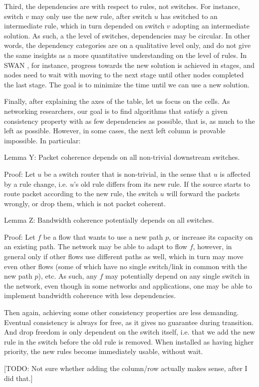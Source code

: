 Third, the dependencies are with respect to rules, not switches. For instance, switch $v$ may only use the new rule, after switch $u$ has switched to an intermediate rule, which in turn depended on switch $v$ adopting an intermediate solution. As such, a the level of switches, dependencies may be circular. In other words, the dependency categories are on a qualitative level only, and do not give the same insights as a more quantitative understanding on the level of rules. In SWAN \cite{swan}, for instance, progress towards the new solution is achieved in stages, and nodes need to wait with moving to the next stage until other nodes completed the last stage. The goal is to minimize the time until we can use a new solution.

Finally, after explaining the axes of the table, let us focus on the cells. As networking researchers, our goal is to find algorithms that satisfy a given consistency property with as few dependencies as possible, that is, as much to the left as possible. However, in some cases, the next left column is provable impossible. In particular:

Lemma Y: Packet coherence depends on all non-trivial downstream switches.

Proof: Let $u$ be a switch router that is non-trivial, in the sense that $u$ is affected by a rule change, i.e. $u$'s old rule differs from its new rule. If the source starts to route packet according to the new rule, the switch $u$ will forward the packets wrongly, or drop them, which is not packet coherent.

Lemma Z: Bandwidth coherence potentially depends on all switches.

Proof: Let $f$ be a flow that wants to use a new path $p$, or increase its capacity on an existing path. The network may be able to adapt to flow $f$, however, in general only if other flows use different paths as well, which in turn may move even other flows (some of which have no single switch/link in common with the new path $p$), etc. As such, any $f$ may potentially depend on any single switch in the network, even though in some networks and applications, one may be able to implement bandwidth coherence with less dependencies.

Then again, achieving some other consistency properties are less demanding. Eventual consistency is always for free, as it gives no guarantee during transition. And drop freedom is only dependent on the switch itself, i.e. that we add the new rule in the switch before the old rule is removed. When installed as having higher priority, the new rules become immediately usable, without wait.

[TODO: Not sure whether adding the column/row actually makes sense, after I did that.]

